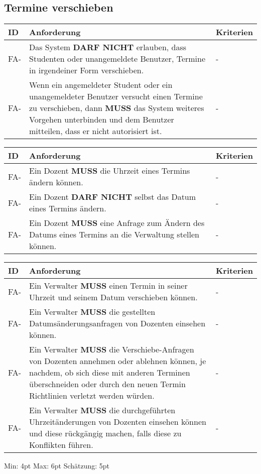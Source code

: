 \newpage

\subsection{Termine verschieben}

\begin{tabular} {|p{}|p{11cm}|p{}|}
	\hline
	ID & Anforderung & Kriterien \\
	\hline
	FA-
	& Das System \textbf{DARF NICHT} erlauben, dass Studenten oder unangemeldete Benutzer, Termine in irgendeiner Form verschieben. 
	& - \\
	\hline
	FA-
	& Wenn ein angemeldeter Student oder ein unangemeldeter Benutzer versucht einen Termine zu verschieben, dann \textbf{MUSS} das System weiteres Vorgehen unterbinden und dem Benutzer mitteilen, dass er nicht autorisiert ist.
	& - \\ 
	\hline
\end{tabular}

\begin{tabular} {|p{}|p{11cm}|p{}|}
	\hline
	ID & Anforderung & Kriterien \\
	\hline
	FA-
	& Ein Dozent \textbf{MUSS} die Uhrzeit eines Termins ändern können.
	& - \\
	\hline
	FA-
	& Ein Dozent \textbf{DARF NICHT} selbst das Datum eines Termins ändern.
	& - \\
	\hline
	FA-
	& Ein Dozent \textbf{MUSS} eine Anfrage zum Ändern des Datums eines Termins an die Verwaltung stellen können.
	& - \\
	\hline
\end{tabular}

\begin{tabular} {|p{}|p{11cm}|p{}|}
	\hline
	ID & Anforderung & Kriterien \\
	\hline
	FA-
	& Ein Verwalter \textbf{MUSS} einen Termin in seiner Uhrzeit und seinem Datum verschieben können.
	& - \\
	\hline
	FA-
	& Ein Verwalter \textbf{MUSS} die gestellten Datumsänderungsanfragen von Dozenten einsehen können.
	& - \\
	\hline
	FA-
	& Ein Verwalter \textbf{MUSS} die Verschiebe-Anfragen von Dozenten annehmen oder ablehnen können, je nachdem, ob sich diese mit anderen Terminen überschneiden oder durch den neuen Termin Richtlinien verletzt werden würden.
	& - \\
	\hline
	FA-
	& Ein Verwalter \textbf{MUSS} die durchgeführten Uhrzeitänderungen von Dozenten einsehen können und diese rückgängig machen, falls diese zu Konflikten führen.
	& - \\
	\hline
\end{tabular}
Min: 4pt
Max: 6pt
Schätzung: 5pt

